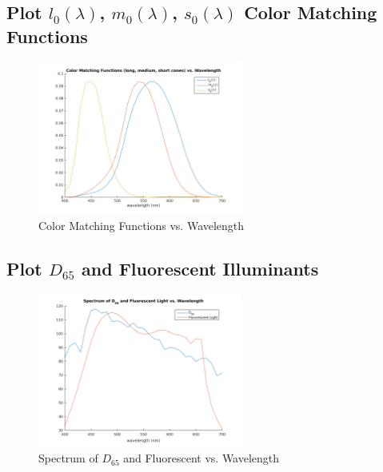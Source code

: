 \documentclass{article}
\begin{document}
\subsection{Plot $l_{0}(\lambda)$, $m_{0}(\lambda)$, $s_{0}(\lambda)$ Color
			Matching Functions}
	\begin{figure}[h]
		\begin{center}
			\includegraphics[width=0.6\textwidth]{lmnmatching.png}
			\caption{Color Matching Functions vs. Wavelength}
		\end{center}
	\end{figure}

\subsection{Plot $D_{65}$ and Fluorescent Illuminants}
	\begin{figure}[h]
		\begin{center}
			\includegraphics[width=0.6\textwidth]{illuminants.png}
			\caption{Spectrum of $D_{65}$ and Fluorescent vs. Wavelength}
		\end{center}
	\end{figure}

\end{document}
